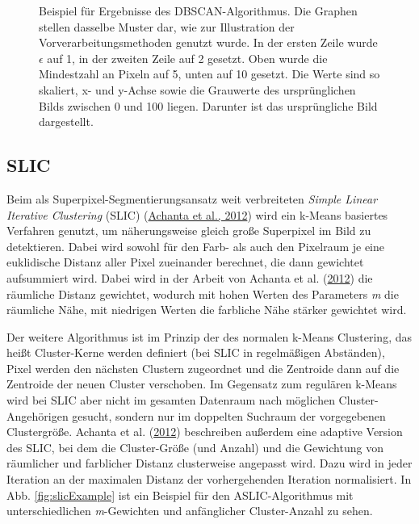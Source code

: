 \documentclass[
  12pt,
  openany]{book}
\begin{document}
\begin{figure}
{}

\caption[Beispiel für Ergebnisse des DBSCAN-Algorithmus.]{Beispiel für Ergebnisse des DBSCAN-Algorithmus. Die Graphen stellen dasselbe Muster dar, wie zur Illustration der Vorverarbeitungsmethoden genutzt wurde. In der ersten Zeile wurde \(\epsilon\) auf 1, in der zweiten Zeile auf 2 gesetzt. Oben wurde die Mindestzahl an Pixeln auf 5, unten auf 10 gesetzt. Die Werte sind so skaliert, x- und y-Achse sowie die Grauwerte des ursprünglichen Bilds zwischen 0 und 100 liegen. Darunter ist das ursprüngliche Bild dargestellt.}\label{fig:dbscanExample}
\end{figure}

\hypertarget{slic}{%
\subsection{SLIC}\label{slic}}

Beim als Superpixel-Segmentierungsansatz weit verbreiteten \emph{Simple Linear Iterative Clustering} (SLIC) (\protect\hyperlink{ref-achantaSLICSuperpixelsCompared2012}{Achanta et al., 2012}) wird ein k-Means basiertes Verfahren genutzt, um näherungsweise gleich große Superpixel im Bild zu detektieren.
Dabei wird sowohl für den Farb- als auch den Pixelraum je eine euklidische Distanz aller Pixel zueinander berechnet, die dann gewichtet aufsummiert wird. Dabei wird in der Arbeit von Achanta et al. (\protect\hyperlink{ref-achantaSLICSuperpixelsCompared2012}{2012}) die räumliche Distanz gewichtet, wodurch mit hohen Werten des Parameters \emph{m} die räumliche Nähe, mit niedrigen Werten die farbliche Nähe stärker gewichtet wird.

Der weitere Algorithmus ist im Prinzip der des normalen k-Means Clustering, das heißt Cluster-Kerne werden definiert (bei SLIC in regelmäßigen Abständen), Pixel werden den nächsten Clustern zugeordnet und die Zentroide dann auf die Zentroide der neuen Cluster verschoben.
Im Gegensatz zum regulären k-Means wird bei SLIC aber nicht im gesamten Datenraum nach möglichen Cluster-Angehörigen gesucht, sondern nur im doppelten Suchraum der vorgegebenen Clustergröße.
Achanta et al. (\protect\hyperlink{ref-achantaSLICSuperpixelsCompared2012}{2012}) beschreiben außerdem eine adaptive Version des SLIC, bei dem die Cluster-Größe (und Anzahl) und die Gewichtung von räumlicher und farblicher Distanz clusterweise angepasst wird. Dazu wird in jeder Iteration an der maximalen Distanz der vorhergehenden Iteration normalisiert.
In Abb. \ref{fig:slicExample} ist ein Beispiel für den ASLIC-Algorithmus mit unterschiedlichen \emph{m}-Gewichten und anfänglicher Cluster-Anzahl zu sehen.
\end{document}
